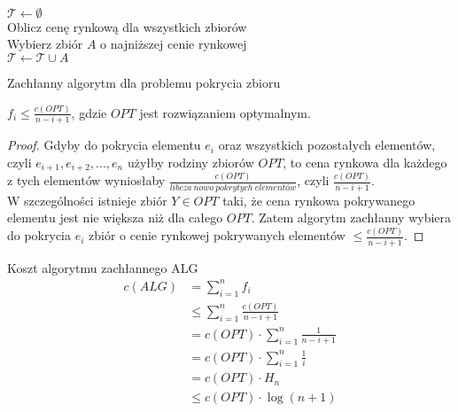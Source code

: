 \begin{algorithm}[H]
  \DontPrintSemicolon
  \\
  \\
  \\
$\mathcal{T} \leftarrow \emptyset$  \\
  {
     Oblicz cenę rynkową dla wszystkich zbiorów\\
     Wybierz zbiór $A$ o najniższej cenie rynkowej\\
     $\mathcal{T} \leftarrow \mathcal{T} \cup A$ 
  }
  \caption{Zachłanny algorytm dla problemu pokrycia zbioru}
  \label{alg-pokrycie}
\end{algorithm}

\begin{lemma}
$f_{i} \leq \frac{c(OPT)}{n-i+1}$, gdzie $OPT$ jest rozwiązaniem optymalnym.\\
\end{lemma}
\begin{proof}
Gdyby do pokrycia elementu $e_i$ oraz wszystkich pozostałych elementów, czyli $e_{i+1}, e_{i+2}, ... , e_{n}$ użyłby rodziny zbiorów $OPT$, to cena rynkowa dla każdego z tych elementów wyniosłaby $\frac{c(OPT)}{libcza \ nowo \ pokrytych \ elementów}$, czyli $\frac{c(OPT)}{n-i+1}$.\\
W szczególności istnieje zbiór $Y \in OPT$ taki, że cena rynkowa pokrywanego elementu jest nie większa niż dla całego $OPT$.
Zatem algorytm zachłanny wybiera do pokrycia $e_i$ zbiór o cenie rynkowej pokrywanych elementów $\leq \frac{c(OPT)}{n-i+1}$.
\end{proof}
Koszt algorytmu zachłannego ALG \\
\begin{align*}
c(ALG) &= \sum_{i=1}^{n} f_i \\ &\leq  
\sum_{i=1}^{n} \frac{c(OPT)}{n-i+1}\\ &= 
c(OPT) \cdot \sum_{i=1}^{n} \frac{1}{n-i+1}\\ &=
 c(OPT) \cdot \sum_{i=1}^{n} \frac{1}{i}\\ &=
  c(OPT) \cdot H_n \\ &\leq c(OPT) \cdot \log(n+1)\\
\end{align*}
